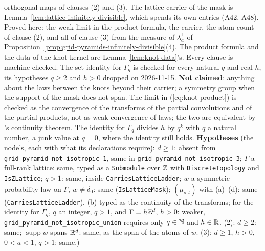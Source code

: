 \begin{proposition}
{orthogonal maps of clauses (2) and (3). The lattice carrier of the mask is
Lemma~\ref{lem:lattice-infinitely-divisible}, which spends its own entries (A42, A48). Proved here:
the weak limit in the product formula, the carrier, the atom count of clause (2), and all
of clause (3) from the \Levy{} measure of $\lambda^{\mathrm L}_a$ of
Proposition~\ref{prop:grid-pyramids-infinitely-divisible}(4). The product formula and the data
of the knot kernel are Lemma~\ref{lem:knot-data}'s. Every clause is machine-checked. The
set identity for $\Gamma_q$ is checked for every natural $q$ and real $h$, its hypotheses $q \ge 2$
and $h > 0$ dropped on 2026-11-15. \textbf{Not claimed}: anything about the laws between the knots
beyond their carrier; a symmetry group when the support of the mask does not span.
The limit in (\ref{eq:knot-product}) is checked as the convergence of the transforms of the partial
convolutions and of the partial products, not as weak convergence of laws; the two are equivalent by
\Levy{}'s continuity theorem. The identity for $\Gamma_q$ divides $h$ by $q^k$ with $q$ a natural
number, a junk value at $q = 0$, where the identity still holds.
\textbf{Hypotheses} (the node's, each with what its declarations require): $d \ge 1$: absent from
\texttt{grid\_pyramid\_not\_isotropic\_1}, same in \texttt{grid\_pyramid\_not\_isotropic\_3};
$\Gamma$ a full-rank lattice: same, typed as a \texttt{Submodule} over $\mathbb{Z}$ with
\texttt{DiscreteTopology} and \texttt{IsZLattice}; $q > 1$: same, inside
\texttt{CarriesLatticeLadder}; $w$ a symmetric probability law on $\Gamma$, $w \ne \delta_0$: same
(\texttt{IsLatticeMask}); $(\mu_{s,t})$ with (a)--(d): same (\texttt{CarriesLatticeLadder}), (b)
typed as the continuity of the transforms; for the identity for $\Gamma_q$, $q$ an integer, $q > 1$,
and $\Gamma = h\mathbb{Z}^d$, $h > 0$: weaker, \texttt{grid\_pyramid\_not\_isotropic\_union} requires only
$q \in \mathbb{N}$ and $h \in \mathbb{R}$. (2): $d \ge 2$: same; $\operatorname{supp} w$ spans $\mathbb{R}^d$: same, as
the span of the atoms of $w$. (3): $d \ge 1$, $h > 0$, $0 < a < 1$, $q > 1$: same.)}
\end{proposition}

